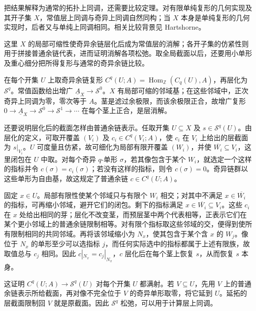 \ProseParagraphBreak
把结果解释为通常的拓扑上同调，还需要比较定理。对有限单纯复形的几何实现及其开子集 \(X\)，常值层上同调与奇异上同调自然同构；当 \(X\) 本身是单纯复形的几何实现时，后者又与单纯上同调相同。相关比较背景见 Hartshorne\cite[Chapter III, Section 2, Historical Note, p. 211]{Hartshorne1977}。
\begin{proofsketch}
	这里 \(X\) 的局部可缩性使奇异余链层化后成为常值层的消解；各开子集的仿紧性则用于拼接普通余链代表，进而证明消解各项松弛。取全局截面以后，还要用小单形及重心细分把所得复形与通常的奇异余链比较。

	在每个开集 \(U\) 上取奇异余链复形 \(C^q(U;A)=\operatorname{Hom}_{\mathbb Z}(C_q(U),A)\)，再层化为 \(\mathcal S^q\)。常值函数给出增广 \(\underline A_X\to\mathcal S^0\)。\(X\) 有局部可缩的邻域基；在这些邻域中，正次奇异上同调为零，零次等于 \(A\)。茎是滤过余极限，而该余极限正合，故增广复形 \(0\to\underline A_X\to\mathcal S^0\to\mathcal S^1\to\cdots\) 在每个茎上正合，是层消解。

	还要说明层化后的截面怎样由普通余链表示。任取开集 \(U\subseteq X\) 及 \(s\in\mathcal S^q(U)\)。由层化的定义，可取开覆盖 \((V_i)\) 及 \(c_i\in C^q(V_i;A)\)，使 \(c_i\) 在 \(V_i\) 上给出的层截面为 \(s|_{V_i}\)。\(U\) 可度量且仿紧，故可细化为局部有限开覆盖 \((W_i)\)，并使 \(\overline{W_i}\subseteq V_i\)，这里闭包在 \(U\) 中取。对每个奇异 \(q\)-单形 \(\sigma\)，若其像包含于某个 \(W_i\)，就选定一个这样的指标并令 \(c(\sigma)=c_i(\sigma)\)；若没有这样的指标，则令 \(c(\sigma)=0\)。奇异链群以这些单形为自由基，故这规定了普通余链 \(c\in C^q(U;A)\)。

	固定 \(x\in U\)。局部有限性使某个邻域只与有限个 \(W_i\) 相交；对其中不满足 \(x\in\overline{W_i}\) 的指标，可再缩小邻域，避开它们的闭包。剩下的指标满足 \(x\in\overline{W_i}\subseteq V_i\)。这些 \(c_i\) 在 \(x\) 处给出相同的芽；层化不改变茎，而预层茎中两个代表相等，正表示它们在某个更小邻域上的普通余链限制相等。对有限个指标取这些邻域的交，便得到使所有限制相同的共同邻域。再将该邻域缩小为 \(N_x\)，使其包含于某个含 \(x\) 的 \(W_j\)。像位于 \(N_x\) 的单形至少可以选指标 \(j\)，而任何实际选中的指标都属于上述有限族，故取值总与 \(c_j\) 相同。因此 \(c|_{N_x}=c_j|_{N_x}\)，\(c\) 层化后在每个茎上恢复 \(s\)，从而恢复 \(s\) 本身。

	这证明 \(C^q(U;A)\to\mathcal S^q(U)\) 对每个开集 \(U\) 都满射。若 \(V\subseteq U\)，先用 \(V\) 上的普通余链表示所给截面，再对像不完全位于 \(V\) 的奇异单形取零，将它延到 \(U\)。延拓的层截面限制回 \(V\) 就是原截面。因此 \(\mathcal S^q\) 松弛，可以用于计算层上同调。


\end{proofsketch}
